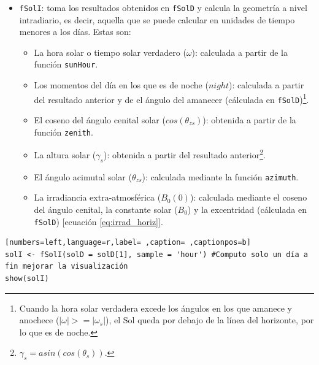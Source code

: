 \begin{itemize}
\item \texttt{fSolI}: toma los resultados obtenidos en \texttt{fSolD} y calcula la geometría a nivel intradiario, es decir, aquella que se puede calcular en unidades de tiempo menores a los días.
Estas son:
\begin{itemize}
\item La hora solar o tiempo solar verdadero (\(\omega\)): calculada a partir de la función \texttt{sunHour}.
\item Los momentos del día en los que es de noche (\(night\)): calculada a partir del resultado anterior y de el ángulo del amanecer (cálculada en \texttt{fSolD})\footnote{Cuando la hora solar verdadera excede los ángulos en los que amanece y anochece (\(|\omega|>=|\omega_s|\)), el Sol queda por debajo de la línea del horizonte, por lo que es de noche.}.
\item El coseno del ángulo cenital solar (\(cos(\theta_{zs})\)): obtenida a partir de la función \texttt{zenith}.
\item La altura solar (\(\gamma_s\)): obtenida a partir del resultado anterior\footnote{\(\gamma_s=asin(cos(\theta_s))\).}.
\item El ángulo acimutal solar (\(\theta_{zs}\)): calculada mediante la función \texttt{azimuth}.
\item La irradiancia extra-atmosférica (\(B_0(0)\)): calculada mediante el coseno del ángulo cenital, la constante solar (\(B_0\)) y la excentridad (cálculada en \texttt{fSolD}) [ecuación \ref{eq:irrad_horiz}].
\end{itemize}
\end{itemize}
\begin{lstlisting}[numbers=left,language=r,label= ,caption= ,captionpos=b]
solI <- fSolI(solD = solD[1], sample = 'hour') #Computo solo un día a fin mejorar la visualización
show(solI)
\end{lstlisting}

